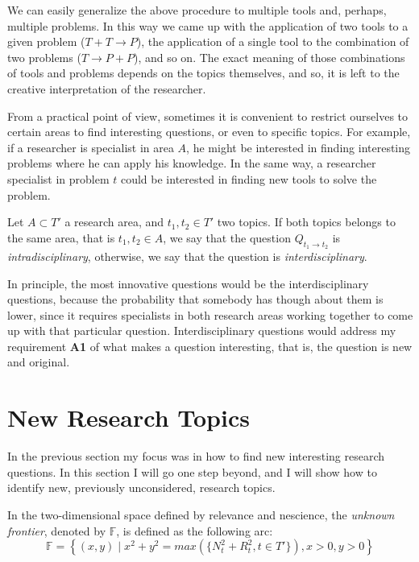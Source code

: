 We can easily generalize the above procedure to multiple tools and, perhaps, multiple problems. In this way we came up with the application of two tools to a given problem ($T+T \rightarrow P$), the application of a single tool to the combination of two problems ($T \rightarrow P + P$), and so on. The exact meaning of those combinations of tools and problems depends on the topics themselves, and so, it is left to the creative interpretation of the researcher.

From a practical point of view, sometimes it is convenient to restrict ourselves to certain areas to find interesting questions, or even to specific topics. For example, if a researcher is specialist in area $A$, he might be interested in finding interesting problems where he can apply his knowledge. In the same way, a researcher specialist in problem $t$ could be interested in finding new tools to solve the problem.

\begin{definition} 
Let $A \subset T'$ a research area, and $t_{1}, t_{2} \in T'$ two topics. If both topics belongs to the same area, that is $t_{1}, t_{2} \in A$, we say that the question $Q_{t_{1} \rightarrow t_{2}}$ is \emph{intradisciplinary}, otherwise, we say that the question is \emph{interdisciplinary}.
\end{definition}

In principle, the most innovative questions would be the interdisciplinary questions, because the probability that somebody has though about them is lower, since it requires specialists in both research areas working together to come up with that particular question. Interdisciplinary questions would address my requirement \textbf{A1} of what makes a question interesting, that is, the question is new and original.

%
%

\section{New Research Topics}
\label{sec:New_Research_Topics}

In the previous section my focus was in how to find new interesting research questions. In this section I will go one step beyond, and I will show how to identify new, previously unconsidered, research topics.

\begin{definition}
In the two-dimensional space defined by relevance and nescience, the \textit{unknown frontier}, denoted by $\mathbb{F}$, is defined as the following arc:
\[
\mathbb{F} = \left\{(x,y) \mid x^{2}+y^{2}=max(\{N^2_{t} + R^2_{t}, t \in T'\}),x>0,y>0\right\} 
\]
\end{definition}

